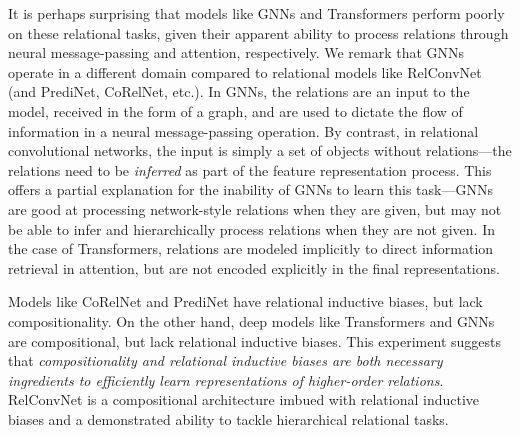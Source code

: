 It is perhaps surprising that models like GNNs and Transformers perform poorly on these relational tasks, given their apparent ability to process relations through neural message-passing and attention, respectively. We remark that GNNs operate in a different domain compared to relational models like RelConvNet (and PrediNet, CoRelNet, etc.). In GNNs, the relations are an input to the model, received in the form of a graph, and are used to dictate the flow of information in a neural message-passing operation. By contrast, in relational convolutional networks, the input is simply a set of objects without relations---the relations need to be \textit{inferred} as part of the feature representation process. 
This offers a partial explanation for the inability of GNNs to learn this task---GNNs are good at processing network-style relations when they are given, but may not be able to infer and hierarchically process relations when they are not given. In the case of Transformers, relations are modeled implicitly to direct information retrieval in attention, but are not encoded explicitly in the final representations.

Models like CoRelNet and PrediNet have relational inductive biases, but lack compositionality. On the other hand, deep models like Transformers and GNNs are compositional, but lack relational inductive biases. This experiment suggests that \textit{compositionality and relational inductive biases are both necessary ingredients to efficiently learn representations of higher-order relations}. RelConvNet is a compositional architecture imbued with relational inductive biases and a demonstrated ability to tackle hierarchical relational tasks.